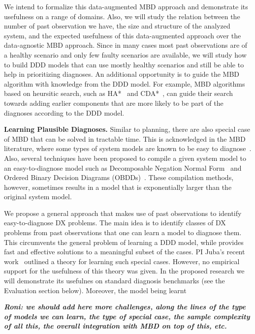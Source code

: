 \documentclass[12pt]{article}
\newcommand{\note}[1]{\textbf{\textit{#1}}}
\begin{document}
We intend to formalize this data-augmented MBD approach and demonstrate its usefulness on a range of domains. Also, we will study the relation between the number of past observation we have, the size and structure of the analyzed system, and the expected usefulness of this data-augmented approach over the data-agnostic MBD approach. Since in many cases most past observations are of a healthy scenario and only few faulty scenarios are available, we will study how to build DDD models that can use mostly healthy scenarios and still be able to help in prioritizing diagnoses. An additional opportunity is to guide the MBD algorithm with knowledge from the DDD model. For example, MBD algorithms based on heursitic search, such as HA*~\cite{feldman2006two} and CDA*~\cite{williams2007conflict}, can guide their search towards adding earlier components that are more likely to be part of the diagnoses according to the DDD model. 


{\bf Learning Plausible Diagnoses.} Similar to planning, there are also special case of MBD that can be solved in tractable time. This is acknowledged in the MBD literature, where some types of system models are known to be easy to diagnose~\cite{horn}. Also, several techniques have been proposed to compile a given system model to an easy-to-diagnose model such as Decomposable Negation Normal Form~\cite{darwiche2001decomposable} and Ordered Binary Decision Diagrams (OBDDs)~\cite{torta2006onTheUse}. These compilation methods, however, sometimes results in a model that is exponentially larger than the original system model. 

We propose a general approach that makes use of past observations to identify easy-to-diagnose DX problems. The main idea is to identify classes of DX problems from past observations that one can learn a model to diagnose them. This circumvents the general problem of learning a DDD model, while provides fast and effective solutions to a meaningful subset of the cases. 
PI Juba's recent work~\cite{juba2016aaai} outlined a theory for learning such special cases. However, no empirical support for the usefulness of this theory was given. In the proposed research we will demonstrate its usefulnes on standard diagnosis benchmarks (see the Evaluation section below). Moreover, the model being learnt

\note{Roni: we should add here more challenges, along the lines of the type of models we can learn, the type of special case, the sample complexity of all this, the overall integration with MBD on top of this, etc.}
\end{document}
